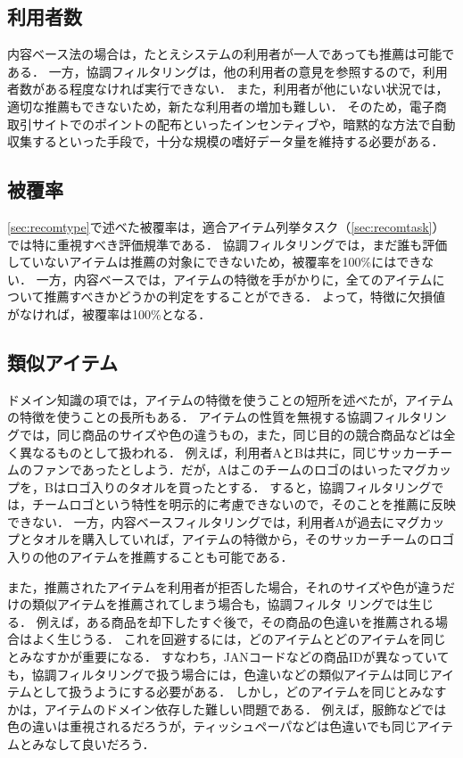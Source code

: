 \subsection{利用者数}

内容ベース法の場合は，たとえシステムの利用者が一人であっても推薦は可能である．
一方，協調フィルタリングは，他の利用者の意見を参照するので，利用者数がある程度なければ実行できない．
また，利用者が他にいない状況では，適切な推薦もできないため，新たな利用者の増加も難しい．
そのため，電子商取引サイトでのポイントの配布といったインセンティブや，暗黙的な方法で自動収集するといった手段で，十分な規模の嗜好データ量を維持する必要がある．

\subsection{被覆率}

\ref{sec:recomtype}で述べた被覆率は，適合アイテム列挙タスク（\ref{sec:recomtask}）では特に重視すべき評価規準である．
協調フィルタリングでは，まだ誰も評価していないアイテムは推薦の対象にできないため，被覆率を100\%にはできない．
一方，内容ベースでは，アイテムの特徴を手がかりに，全てのアイテムについて推薦すべきかどうかの判定をすることができる．
よって，特徴に欠損値がなければ，被覆率は100\%となる．

\subsection{類似アイテム}

ドメイン知識の項では，アイテムの特徴を使うことの短所を述べたが，アイテムの特徴を使うことの長所もある．
アイテムの性質を無視する協調フィルタリングでは，同じ商品のサイズや色の違うもの，また，同じ目的の競合商品などは全く異なるものとして扱われる．
例えば，利用者AとBは共に，同じサッカーチームのファンであったとしよう．だが，Aはこのチームのロゴのはいったマグカップを，Bはロゴ入りのタオルを買ったとする．
すると，協調フィルタリングでは，チームロゴという特性を明示的に考慮できないので，そのことを推薦に反映できない．
一方，内容ベースフィルタリングでは，利用者Aが過去にマグカップとタオルを購入していれば，アイテムの特徴から，そのサッカーチームのロゴ入りの他のアイテムを推薦することも可能である．

また，推薦されたアイテムを利用者が拒否した場合，それのサイズや色が違うだけの類似アイテムを推薦されてしまう場合も，協調フィルタ
リングでは生じる．
例えば，ある商品を却下したすぐ後で，その商品の色違いを推薦される場合はよく生じうる．
これを回避するには，どのアイテムとどのアイテムを同じとみなすかが重要になる．
すなわち，JANコードなどの商品IDが異なっていても，協調フィルタリングで扱う場合には，色違いなどの類似アイテムは同じアイテムとして扱うようにする必要がある．
しかし，どのアイテムを同じとみなすかは，アイテムのドメイン依存した難しい問題である．
例えば，服飾などでは色の違いは重視されるだろうが，ティッシュペーパなどは色違いでも同じアイテムとみなして良いだろう．

